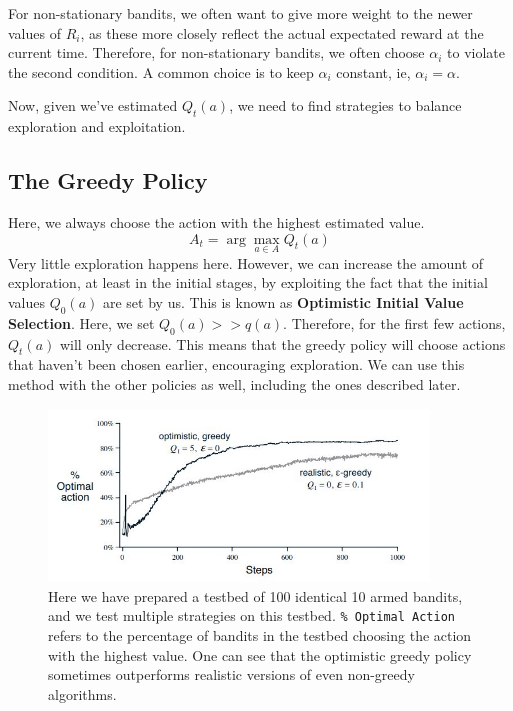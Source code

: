 \documentclass[12pt]{report}
\begin{document}
For non-stationary bandits, we often want to give more weight to the newer values of $R_{i}$, as these more closely reflect the actual expectated reward at the current time.
Therefore, for non-stationary bandits, we often choose $\alpha_{i}$ to violate the second condition. A common choice is to keep $\alpha_{i}$ constant, ie, $\alpha_{i} = \alpha$.

Now, given we've estimated $Q_{t}(a)$, we need to find strategies to balance exploration and exploitation.

\subsection{The Greedy Policy}
Here, we always choose the action with the highest estimated value.
\begin{equation}
    A_{t} = \arg\max_{a \in A} Q_{t}(a) 
\end{equation}
Very little exploration happens here. However, we can increase the amount of exploration, at least in the initial stages, by exploiting the fact that the initial values $Q_{0}(a)$ are set by us.
This is known as \textbf{Optimistic Initial Value Selection}. Here, we set $Q_{0}(a) >> q(a)$. Therefore, for the first few actions, $Q_{t}(a)$ will only decrease. This means that the greedy policy will 
choose actions that haven't been chosen earlier, encouraging exploration. We can use this method with the other policies as well, including the ones described later. 
\begin{figure}[h!]
    \centering
    \includegraphics[width=0.9\textwidth]{images/optimistic-policy.jpg}
    \caption{Here we have prepared a testbed of 100 identical 10 armed bandits, and we test multiple strategies on this testbed. \texttt{\% Optimal Action} refers to the percentage of bandits in the testbed choosing the action with the highest value. One can see that the optimistic greedy policy sometimes outperforms realistic versions of even non-greedy algorithms.}
\end{figure}
\end{document}
